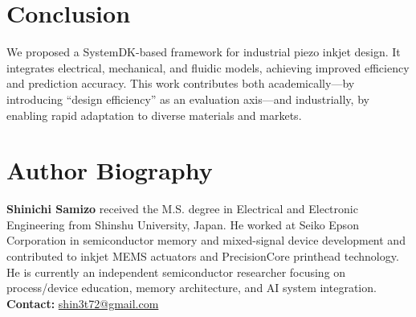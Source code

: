 \documentclass[conference]{IEEEtran}
\begin{document}
\section{Conclusion}
We proposed a SystemDK-based framework for industrial piezo inkjet design. 
It integrates electrical, mechanical, and fluidic models, achieving improved efficiency and prediction accuracy. 
This work contributes both academically—by introducing ``design efficiency'' as an evaluation axis—and industrially, by enabling rapid adaptation to diverse materials and markets.

\section*{Author Biography}
\textbf{Shinichi Samizo} received the M.S. degree in Electrical and Electronic Engineering from Shinshu University, Japan. 
He worked at Seiko Epson Corporation in semiconductor memory and mixed-signal device development and contributed to inkjet MEMS actuators and PrecisionCore printhead technology. 
He is currently an independent semiconductor researcher focusing on process/device education, memory architecture, and AI system integration.  
\textbf{Contact:} \href{mailto:shin3t72@gmail.com}{shin3t72@gmail.com}



\end{document}
